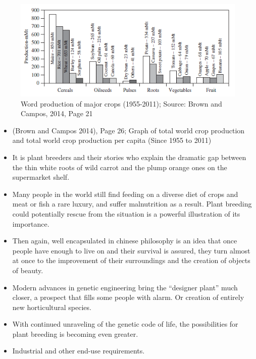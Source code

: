 \documentclass[11pt,ignorenonframetext,aspectratio=169]{beamer}
\begin{document}
\begin{frame}{}
\protect\hypertarget{section-25}{}
\begin{figure}
\includegraphics[width=0.7\linewidth]{./images/world_production_of_major_crops} \caption{Word production of major crops (1955-2011); Source: Brown and Campos, 2014, Page 21}\label{fig:world-production-major}
\end{figure}
\end{frame}

\begin{frame}{}
\protect\hypertarget{section-26}{}
\begin{itemize}
\item
  (Brown and Campos 2014), Page 26; Graph of total world crop production
  and total world crop production per capita (Since 1955 to 2011)
\item
  It is plant breeders and their stories who explain the dramatic gap
  between the thin white roots of wild carrot and the plump orange ones
  on the supermarket shelf.
\item
  Many people in the world still find feeding on a diverse diet of crops
  and meat or fish a rare luxury, and suffer malnutrition as a result.
  Plant breeding could potentially rescue from the situation is a
  powerful illustration of its importance.
\end{itemize}
\end{frame}

\begin{frame}{}
\protect\hypertarget{section-27}{}
\begin{itemize}
\item
  Then again, well encapsulated in chinese philosophy is an idea that
  once people have enough to live on and their survival is assured, they
  turn almost at once to the improvement of their surroundings and the
  creation of objects of beauty.
\item
  Modern advances in genetic engineering bring the ``designer plant''
  much closer, a prospect that fills some people with alarm. Or creation
  of entirely new horticultural species.
\item
  With continued unraveling of the genetic code of life, the
  possibilities for plant breeding is becoming even greater.
\item
  Industrial and other end-use requirements.
\end{itemize}
\end{frame}
\end{document}
